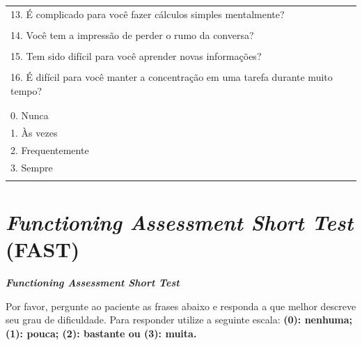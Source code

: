 \documentclass[chapter=TITLE,
               oneside,
               12pt,
               a4paper,
               english,
               brazil]{abntex2}    %
\begin{document}
\begin{anexosenv}
\begin{table}[H]
{\begin{tabular}{@{}p{}@{}}
        \\
        13. É complicado para você fazer cálculos simples mentalmente?
        \\
        \\
        14. Você tem a impressão de perder o rumo da conversa?
        \\
        \\
        15. Tem sido difícil para você aprender novas informações?
        \\
        \\
        16. É difícil para você manter a concentração em uma tarefa durante muito tempo?
        \\
        \\
        \midrule
        \\
        0. Nunca
        \\
        1. Às vezes
        \\
        2. Frequentemente
        \\
        3. Sempre
        \\
        \\ \bottomrule
        \end{tabular}%
        }
        \end{table}

    \chapter{\textit{Functioning Assessment Short Test} (FAST)}

            \noindent
            \large
            \textbf{\textit{Functioning Assessment Short Test}}

            \small
            \noindent
            Por favor, pergunte ao paciente as frases abaixo e responda a
            que melhor descreve seu grau de dificuldade.
            \noindent
            Para responder utilize a seguinte escala:
            \textbf{(0): nenhuma; (1): pouca; (2): bastante ou (3): muita.}


\end{anexosenv}
\end{document}
